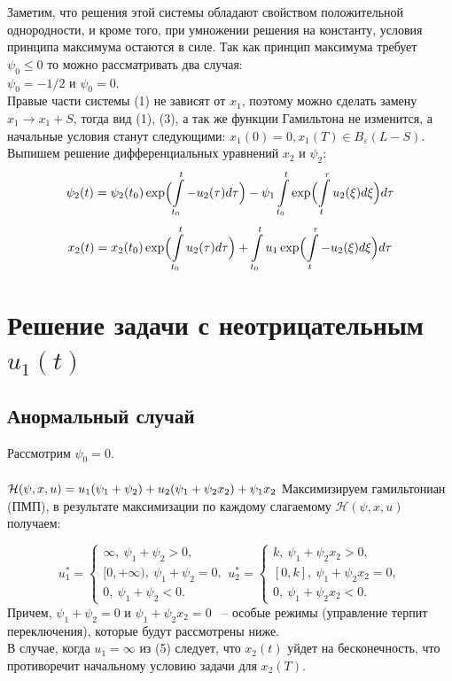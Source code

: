\documentclass[12pt, fleqn]{article}
\begin{document}
Заметим, что решения этой системы обладают свойством положительной однородности, и кроме того, при умножении решения на константу, условия принципа максимума остаются в силе. Так как принцип максимума требует $\psi_0 \leqslant 0$ то можно рассматривать два случая:\\
 $\psi_0 = - 1/2$ и $\psi_0  = 0.$\\
Правые части системы (1) не зависят от $x_1$, поэтому можно сделать замену $x_1 \rightarrow x_1 + S$,
тогда вид (1), (3), а так же функции Гамильтона не изменится, а начальные условия станут следующими: $x_1 (0) = 0, x_1(T) \in  B_\varepsilon(L - S).$
Выпишем решение дифференциальных уравнений
$x_2$ и $\psi_2$:
\begin{equation}
\psi_2(t) = \psi_2(t_0)\exp\Bigl(\int\limits_{t_0}^t -u_2(\tau)d\tau\Bigr) - \psi_1 \int\limits_{t_0}^t \exp\Bigl(\int\limits_t^\tau u_2(\xi)d\xi\Bigr) d\tau
\label{4}
\end{equation}
\begin{equation}
x_2(t) = x_2(t_0)\exp\Bigl(\int\limits_{t_0}^t u_2(\tau)d\tau\Bigr) +  \int\limits_{t_0}^t u_1\exp\Bigl(\int\limits_{t}^\tau -u_2(\xi)d\xi\Bigr) d\tau  \\
\label{5}
\end{equation}
\section{Решение задачи с неотрицательным $u_1(t)$}
\subsection{Анормальный случай}
Рассмотрим $\psi_0 = 0$.\\\\
$
\mathcal{H}(\psi, x, u) = u_1(\psi_1 + \psi_2) + u_2(\psi_1 + \psi_2x_2) + \psi_1x_2\\\\
$
Максимизируем гамильтониан (ПМП), в результате максимизации по каждому слагаемому $\mathcal{H}(\psi, x, u)$ получаем:

$$
u_1^* = \begin{cases}
\infty, \ \psi_1 + \psi_2 > 0,\\
[0, +\infty), \ \psi_1 + \psi_2 = 0, \\
0, \ \psi_1 + \psi_2 < 0.
\end{cases}
u_2^* =  \begin{cases}
k, \ \psi_1 + \psi_2x_2 > 0,\\
[0, k], \ \psi_1 + \psi_2x_2 = 0, \\
0, \ \psi_1 + \psi_2x_2 < 0.
\end{cases}
$$
Причем,  $\psi_1 + \psi_2 = 0$ и $ \psi_1 + \psi_2x_2 = 0$ ~-- особые режимы (управление терпит переключения), которые будут рассмотрены ниже.\\
В случае, когда $u_1 = \infty$ из (5) следует, что $x_2(t)$ уйдет на бесконечность, что противоречит начальному условию задачи для $x_2(T)$.
\end{document}
